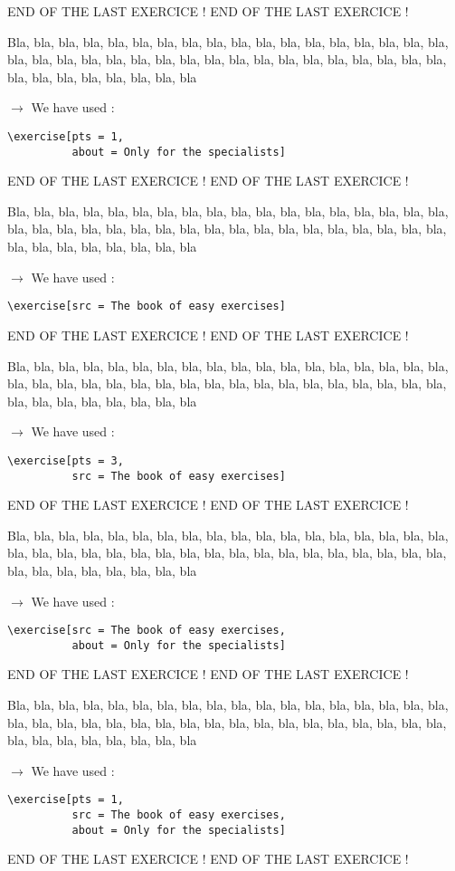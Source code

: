 \documentclass[12pt]{article}
\newcommand\blabla{%
		\noindent%
		Bla, bla, bla, bla, bla, bla, bla, bla, bla, bla, bla,
		bla, bla, bla, bla, bla, bla, bla, bla, bla, bla, bla,
		bla, bla, bla, bla, bla, bla, bla, bla, bla, bla, bla,
		bla, bla, bla, bla, bla, bla, bla, bla, bla, bla, bla
	}
\newcommand\codeused{%
		\blabla{} \medskip  \par
		\noindent $\rightarrow$ We have used :
	}
\begin{document}
\newpage \medskip \noindent END OF THE LAST EXERCICE ! END OF THE LAST EXERCICE !

\exercise[pts = 1, about = Only for the specialists]

\codeused{}
\begin{verbatim}
\exercise[pts = 1,
          about = Only for the specialists]
\end{verbatim}



\newpage \medskip \noindent END OF THE LAST EXERCICE ! END OF THE LAST EXERCICE !

\exercise[src = The book of easy exercises]

\codeused{}
\begin{verbatim}
\exercise[src = The book of easy exercises]
\end{verbatim}



\newpage \medskip \noindent END OF THE LAST EXERCICE ! END OF THE LAST EXERCICE !

\exercise[pts = 3, src = The book of easy exercises]

\codeused{}
\begin{verbatim}
\exercise[pts = 3,
          src = The book of easy exercises]
\end{verbatim}



\newpage \medskip \noindent END OF THE LAST EXERCICE ! END OF THE LAST EXERCICE !

\exercise[src = The book of easy exercises, about = Only for the specialists]

\codeused{}
\begin{verbatim}
\exercise[src = The book of easy exercises,
          about = Only for the specialists]
\end{verbatim}



\newpage \medskip \noindent END OF THE LAST EXERCICE ! END OF THE LAST EXERCICE !

\exercise[pts = 1, src = The book of easy exercises, about = Only for the specialists]

\codeused{}
\begin{verbatim}
\exercise[pts = 1,
          src = The book of easy exercises,
          about = Only for the specialists]
\end{verbatim}


\newpage \medskip \noindent END OF THE LAST EXERCICE ! END OF THE LAST EXERCICE !
\end{document}
